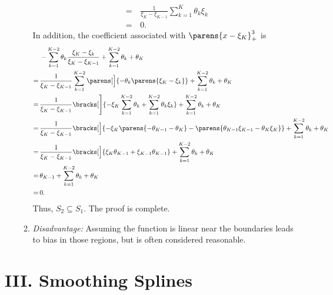 \documentclass[12pt]{article}
\begin{document}
\begin{enumerate}[label=\textbf{\arabic*.}]
\begin{enumerate}
\begin{align*}
			= & \, \frac{1}{\xi_K - \xi_{K-1}} \sum_{k=1}^{K} \theta_k \xi_k \\ 
			= & \, 0. 
		\end{align*}
		In addition, the coefficient associated with $\parens{x-\xi_{K}}_+^3$ is 
		\begin{align*}
			& \, - \sum_{k=1}^{K-2} \theta_k \frac{\xi_K - \xi_k}{\xi_K - \xi_{K-1}} + \sum_{k=1}^{K-2} \theta_k + \theta_K \\ 
			= & \, \frac{1}{\xi_K - \xi_{K-1}} \sum_{k=1}^{K-2} \parens[\Big]{- \theta_k \parens{\xi_K - \xi_k} } + \sum_{k=1}^{K-2} \theta_k + \theta_K \\ 
			= & \, \frac{1}{\xi_K - \xi_{K-1}} \bracks[\Bigg]{ - \xi_K \sum_{k=1}^{K-2} \theta_k + \sum_{k=1}^{K-2} \theta_k \xi_k} + \sum_{k=1}^{K-2} \theta_k + \theta_K \\ 
			= & \, \frac{1}{\xi_K - \xi_{K-1}} \bracks[\Big]{ - \xi_K \parens{-\theta_{K-1} - \theta_K} - \parens{ \theta_{K-1} \xi_{K-1} - \theta_K \xi_K }} + \sum_{k=1}^{K-2} \theta_k + \theta_K \\ 
			= & \, \frac{1}{\xi_K - \xi_{K-1}} \bracks[\Big]{ \xi_K \theta_{K-1} + \xi_{K-1} \theta_{K-1} } + \sum_{k=1}^{K-2} \theta_k + \theta_K \\ 
			= & \, \theta_{K-1} + \sum_{k=1}^{K-2} \theta_k + \theta_K \\ 
			= & \, 0. 
		\end{align*}
		Thus, $S_2 \subseteq S_1$. The proof is complete. 
				
		\item \textit{Disadvantage:} Assuming the function is linear near the boundaries leads to bias in those regions, but is often considered reasonable. 
	
	\end{enumerate}
	
\end{enumerate}


\section*{III. Smoothing Splines} 
\end{document}
